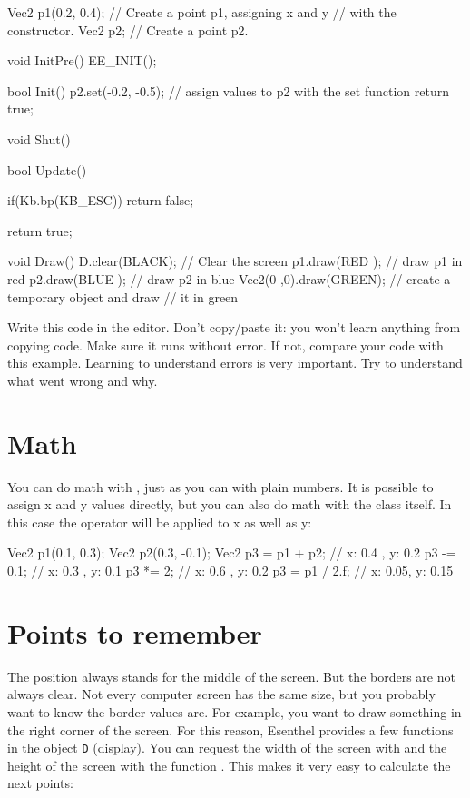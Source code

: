 \begin{code}
Vec2 p1(0.2, 0.4); // Create a point p1, assigning x and y 
                   // with the constructor.
Vec2 p2;           // Create a point p2.

void InitPre()
{
   EE_INIT();
}

bool Init()
{
   p2.set(-0.2, -0.5); // assign values to p2 with the set function
   return true;
}

void Shut() {}

bool Update()
{
   if(Kb.bp(KB_ESC)) return false;
   
   return true;
}

void Draw()
{
   D.clear(BLACK); // Clear the screen
   p1.draw(RED  ); // draw p1 in red  
   p2.draw(BLUE ); // draw p2 in blue
   Vec2(0 ,0).draw(GREEN); // create a temporary object and draw 
	                         // it in green
}

\end{code}

\begin{exercise}
Write this code in the editor. Don't copy/paste it: you won't learn anything from copying code. Make sure it runs without error. If not, compare your code with this example. Learning to understand errors is very important. Try to understand what went wrong and why.
\end{exercise}

\section{Math}
You can do math with , just as you can with plain numbers. It is possible to assign x and y values directly, but you can also do math with the class itself. In this case the operator will be applied to x as well as y:

\begin{code}
Vec2 p1(0.1,  0.3);
Vec2 p2(0.3, -0.1);
Vec2 p3 = p1 + p2;  // x: 0.4 , y: 0.2
p3 -= 0.1;          // x: 0.3 , y: 0.1
p3 *= 2;            // x: 0.6 , y: 0.2
p3 = p1 / 2.f;      // x: 0.05, y: 0.15 
\end{code}

\section{Points to remember}
The position  always stands for the middle of the screen. But the borders are not always clear. Not every computer screen has the same size, but you probably want to know the border values are. For example, you want to draw something in the right corner of the screen. For this reason, Esenthel provides a few functions in the object \texttt{D} (display). You can request the width of the screen with  and the height of the screen with the function . This makes it very easy to calculate the next points:

